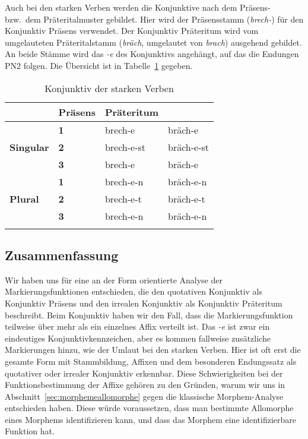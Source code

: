 Auch bei den starken Verben werden die Konjunktive nach dem Präsens- bzw.\ dem Präteritalmuster gebildet.
Hier wird der Präsensstamm (\textit{brech-}) für den Konjunktiv Präsens verwendet.
Der Konjunktiv Präteritum wird vom umgelauteten Präteritalstamm (\textit{bräch}, umgelautet von \textit{brach}) ausgehend gebildet.
An beide Stämme wird das \textit{-e} des Konjunktivs angehängt, auf das die Endungen PN2 folgen.
Die Übersicht ist in Tabelle~\ref{tab:stkonj} gegeben.

\begin{table}
  \centering
  \begin{tabular}{llll}
    \lsptoprule
    \multicolumn{2}{c}{} & \textbf{Präsens} & \textbf{Präteritum} \\
    \midrule
    \multirow{3}{*}{\textbf{Singular}} & \textbf{1} & brech-e & bräch-e \\
    & \textbf{2} & brech-e-st & bräch-e-st \\
    & \textbf{3} & brech-e & bräch-e \\
    \midrule
    \multirow{3}{*}{\textbf{Plural}} & \textbf{1} & brech-e-n & bräch-e-n \\
    & \textbf{2} & brech-e-t & bräch-e-t \\
    & \textbf{3} & brech-e-n & bräch-e-n \\
    \lspbottomrule
  \end{tabular}
  \caption{Konjunktiv der starken Verben}
  \label{tab:stkonj}
\end{table}


\subsection{Zusammenfassung}

\label{sec:zusammenfassungverbflexion}


Wir haben uns für eine an der Form orientierte Analyse der Markierungsfunktionen entschieden, die den quotativen Konjunktiv als Konjunktiv Präsens und den irrealen Konjunktiv als Konjunktiv Präteritum beschreibt.
Beim Konjunktiv haben wir den Fall, dass die Markierungsfunktion teilweise über mehr als ein einzelnes Affix verteilt ist.
Das \textit{-e} ist zwar ein eindeutiges Konjunktivkennzeichen, aber es kommen fallweise zusätzliche Markierungen hinzu, wie \zB der Umlaut bei den starken Verben.
Hier ist oft erst die gesamte Form mit Stammbildung, Affixen und dem besonderen Endungssatz als quotativer oder irrealer Konjunktiv erkennbar.
Diese Schwierigkeiten bei der Funktionsbestimmung der Affixe gehören zu den Gründen, warum wir uns in Abschnitt~\ref{sec:morphemeallomorphe} gegen die klassische Morphem-Analyse entschieden haben.
Diese würde voraussetzen, dass man bestimmte Allomorphe eines Morphems identifizieren kann, und dass das Morphem eine identifizierbare Funktion hat.

